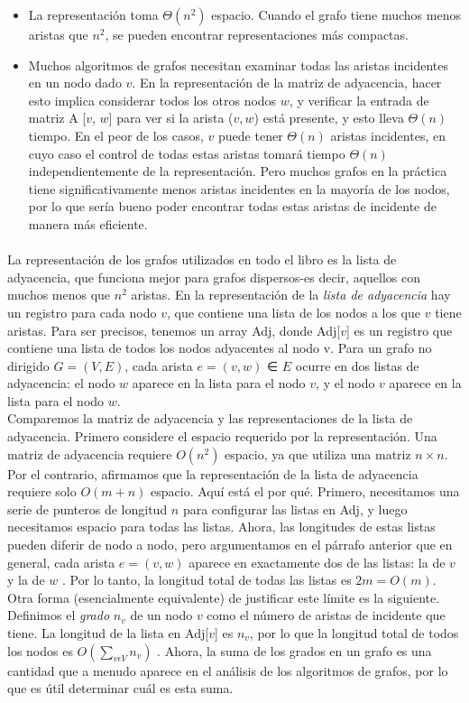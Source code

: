 \documentclass[a4paper]{article}
\begin{document}
\begin{itemize}
\item La representación toma \(\Theta (n^{2})\) espacio. Cuando el grafo tiene muchos menos aristas que \(n^{2}\), se pueden encontrar representaciones más compactas.
\item Muchos algoritmos de grafos necesitan examinar todas las aristas incidentes en un nodo dado $v$. En la representación de la matriz de adyacencia, hacer esto implica considerar todos los otros nodos $w$, y verificar la entrada de matriz A [$v$, $w$] para ver si la arista ($v, w$) está presente, y esto lleva \(\Theta (n)\) tiempo. En el peor de los casos, $v$ puede tener \(\Theta (n)\) aristas incidentes, en cuyo caso el control de todas estas aristas tomará tiempo \(\Theta (n)\) independientemente de la representación. Pero muchos grafos en la práctica tiene significativamente menos aristas incidentes en la mayoría de los nodos, por lo que sería bueno poder encontrar todas estas aristas de incidente de manera más eficiente.
\end{itemize}
\paragraph{}
La representación de los grafos utilizados en todo el libro es la lista de adyacencia, que funciona mejor para grafos dispersos-es decir, aquellos con muchos menos que \(n^{2}\) aristas. En la representación de la \textit{lista de adyacencia} hay un registro para cada nodo $v$, que contiene una lista de los nodos a los que $v$ tiene aristas. Para ser precisos, tenemos un array Adj, donde Adj[$v$] es un registro que contiene una lista de todos los nodos adyacentes al nodo v. Para un grafo no dirigido $G = (V, E)$, cada arista $e =(v, w)$  ∈ $E$ ocurre en dos listas de adyacencia: el nodo $w$ aparece en la lista para el nodo $v$, y el nodo $v$ aparece en la lista para el nodo $w$.\\

Comparemos la matriz de adyacencia y las representaciones de la lista de adyacencia. Primero considere el espacio requerido por la representación. Una matriz de adyacencia requiere \(O(n^{2})\) espacio, ya que utiliza una matriz $n × n$. Por el contrario, afirmamos que la representación de la lista de adyacencia requiere solo \(O(m + n)\) espacio. Aquí está el por qué. Primero, necesitamos una serie de punteros de longitud $n$ para configurar las listas en Adj, y luego necesitamos espacio para todas las listas. Ahora, las longitudes de estas listas pueden diferir de nodo a nodo, pero argumentamos en el párrafo anterior que en general, cada arista \(e = (v, w)\) aparece en exactamente dos de las listas: la de $v$ y la de $w$ . Por lo tanto, la longitud total de todas las listas es \(2m = O(m)\).
\\Otra forma (esencialmente equivalente) de justificar este límite es la siguiente. Definimos el \textit{grado} \(n_{v}\) de un nodo $v$ como el número de aristas de incidente que tiene. La longitud de la lista en Adj[$v$] es \(n_{v}\), por lo que la longitud total de todos los nodos es \(O( \sum_{v\epsilon V} {n_{v}})\) . Ahora, la suma de los grados en un grafo es una cantidad que a menudo aparece en el análisis de los algoritmos de grafos, por lo que es útil determinar cuál es esta suma.
\end{document}
